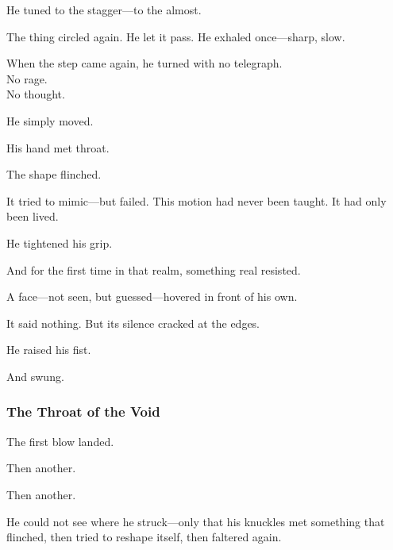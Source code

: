\documentclass[12pt]{article}
\begin{document}
\vspace{0.5em}
He tuned to the stagger---to the almost.

\vspace{0.5em}
The thing circled again. He let it pass. He exhaled once---sharp, slow.

\vspace{0.5em}
When the step came again, he turned with no telegraph.\\
No rage.\\
No thought.

\vspace{0.5em}
He simply moved.

\vspace{0.5em}
His hand met throat.

\vspace{0.5em}
The shape flinched.

\vspace{0.5em}
It tried to mimic---but failed. This motion had never been taught. It had only been lived.

\vspace{0.5em}
He tightened his grip.

\vspace{0.5em}
And for the first time in that realm, something real resisted.

\vspace{0.5em}
A face---not seen, but guessed---hovered in front of his own.

\vspace{0.5em}
It said nothing. But its silence cracked at the edges.

\vspace{0.5em}
He raised his fist.

\vspace{0.5em}
And swung.

\dotfill

\subsubsection*{The Throat of the Void}

The first blow landed.

\vspace{0.5em}
Then another.

\vspace{0.5em}
Then another.

\vspace{0.5em}
He could not see where he struck---only that his knuckles met something that flinched, then tried to reshape itself, then faltered again.
\end{document}
